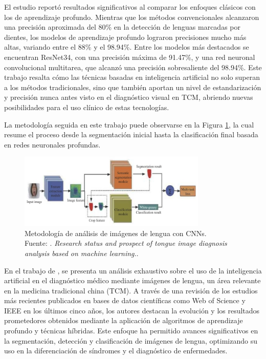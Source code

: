 El estudio reportó resultados significativos al comparar los enfoques clásicos con los de aprendizaje profundo. Mientras que los métodos convencionales alcanzaron una precisión aproximada del 80\% en la detección de lenguas marcadas por dientes, los modelos de aprendizaje profundo lograron precisiones mucho más altas, variando entre el 88\% y el 98.94\%. Entre los modelos más destacados se encuentran ResNet34, con una precisión máxima de 91.47\%, y una red neuronal convolucional multitarea, que alcanzó una precisión sobresaliente del 98.94\%. Este trabajo resalta cómo las técnicas basadas en inteligencia artificial no solo superan a los métodos tradicionales, sino que también aportan un nivel de estandarización y precisión nunca antes visto en el diagnóstico visual en TCM, abriendo nuevas posibilidades para el uso clínico de estas tecnologías.

La metodología seguida en este trabajo puede observarse en la Figura \ref{2:fig125}, la cual resume el proceso desde la segmentación inicial hasta la clasificación final basada en redes neuronales profundas.

\begin{figure}[H]
	\begin{center}
		\includegraphics[width=0.80\textwidth]{2/figures/3.jpeg}
		\caption[Metodología de análisis de imágenes de lengua con CNNs]{Metodología de análisis de imágenes de lengua con CNNs. \\
		Fuente: \cite{Jiatuo2024}. \textit{Research status and prospect of tongue image diagnosis analysis based on machine learning.}.}
		\label{2:fig125}
	\end{center}
\end{figure}

En el trabajo de \cite{Liu2023}, se presenta un análisis exhaustivo sobre el uso de la inteligencia artificial en el diagnóstico médico mediante imágenes de lengua, un área relevante en la medicina tradicional china (TCM). A través de una revisión de los estudios más recientes publicados en bases de datos científicas como Web of Science y IEEE en los últimos cinco años, los autores destacan la evolución y los resultados prometedores obtenidos mediante la aplicación de algoritmos de aprendizaje profundo y técnicas híbridas. Este enfoque ha permitido avances significativos en la segmentación, detección y clasificación de imágenes de lengua, optimizando su uso en la diferenciación de síndromes y el diagnóstico de enfermedades.  

